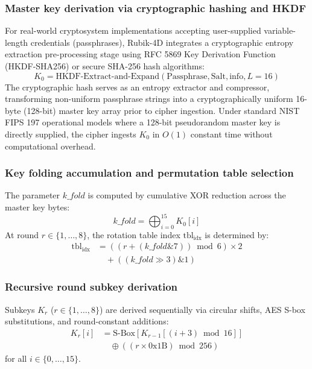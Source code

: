 \documentclass[10pt,twocolumn]{article}
\begin{document}
\subsubsection{Master key derivation via cryptographic hashing and HKDF}
For real-world cryptosystem implementations accepting user-supplied variable-length credentials (passphrases), Rubik-4D integrates a cryptographic entropy extraction pre-processing stage using RFC 5869 Key Derivation Function (HKDF-SHA256) or secure SHA-256 hash algorithms:
\begin{equation}
    K_0 = \text{HKDF-Extract-and-Expand}(\text{Passphrase}, \text{Salt}, \text{info}, L=16)
\end{equation}
The cryptographic hash serves as an entropy extractor and compressor, transforming non-uniform passphrase strings into a cryptographically uniform 16-byte (128-bit) master key array prior to cipher ingestion. Under standard NIST FIPS 197 \cite{nist2001fips} operational models where a 128-bit pseudorandom master key is directly supplied, the cipher ingests $K_0$ in $O(1)$ constant time without computational overhead.

\subsubsection{Key folding accumulation and permutation table selection}
The parameter $\mathit{k\_fold}$ is computed by cumulative XOR reduction across the master key bytes:
\begin{equation}
    \mathit{k\_fold} = \bigoplus_{i=0}^{15} K_0[i]
\end{equation}
At round $r \in \{1, \dots, 8\}$, the rotation table index $\text{tbl}_{\text{idx}}$ is determined by:
\begin{equation}
\begin{aligned}
    \text{tbl}_{\text{idx}} &= \left( (r + (\mathit{k\_fold} \mathbin{\&} 7)) \bmod 6 \right) \times 2 \\
    &\quad + ((\mathit{k\_fold} \gg 3) \mathbin{\&} 1)
\end{aligned}
\end{equation}

\subsubsection{Recursive round subkey derivation}
Subkeys $K_r$ ($r \in \{1, \dots, 8\}$) are derived sequentially via circular shifts, AES S-box substitutions, and round-constant additions:
\begin{equation}
\begin{aligned}
    K_r[i] &= \text{S-Box}\left[ K_{r-1}[(i + 3) \bmod 16] \right] \\
    &\quad \oplus \left( (r \times \text{0x1B}) \bmod 256 \right)
\end{aligned}
\end{equation}
for all $i \in \{0, \dots, 15\}$.
\end{document}
